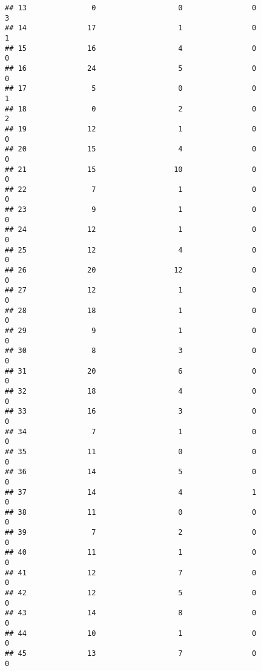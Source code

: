 \documentclass[
]{article}
\begin{document}
\begin{verbatim}
## 13               0                   0                0                   3
## 14              17                   1                0                   1
## 15              16                   4                0                   0
## 16              24                   5                0                   0
## 17               5                   0                0                   1
## 18               0                   2                0                   2
## 19              12                   1                0                   0
## 20              15                   4                0                   0
## 21              15                  10                0                   0
## 22               7                   1                0                   0
## 23               9                   1                0                   0
## 24              12                   1                0                   0
## 25              12                   4                0                   0
## 26              20                  12                0                   0
## 27              12                   1                0                   0
## 28              18                   1                0                   0
## 29               9                   1                0                   0
## 30               8                   3                0                   0
## 31              20                   6                0                   0
## 32              18                   4                0                   0
## 33              16                   3                0                   0
## 34               7                   1                0                   0
## 35              11                   0                0                   0
## 36              14                   5                0                   0
## 37              14                   4                1                   0
## 38              11                   0                0                   0
## 39               7                   2                0                   0
## 40              11                   1                0                   0
## 41              12                   7                0                   0
## 42              12                   5                0                   0
## 43              14                   8                0                   0
## 44              10                   1                0                   0
## 45              13                   7                0                   0

\end{verbatim}
\end{document}
